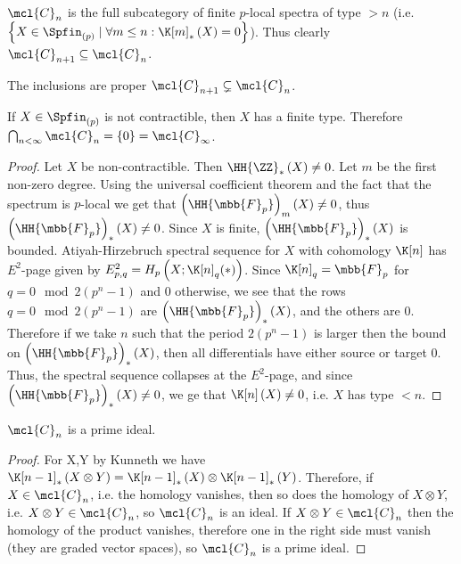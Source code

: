 \begin{corollary}
	$\mcl{C}_n$ is the full subcategory of finite $p$-local spectra of type $> n$ (i.e. $\left\{ X \in \Spfin_{\left(p\right)} \mid \forall m \leq n: \K[m]_*\left(X\right) = 0 \right\}$).
	Thus clearly $\mcl{C}_{n+1} \subseteq \mcl{C}_n$.
\end{corollary}

\begin{proposition}
	The inclusions are proper $\mcl{C}_{n+1} \subsetneq \mcl{C}_n$.
\end{proposition}

\begin{proposition}
	If $X \in \Spfin_{\left(p\right)}$ is not contractible, then $X$ has a finite type.
	Therefore $\bigcap_{n < \infty} \mcl{C}_n = \left\{0\right\} = \mcl{C}_\infty$.
\end{proposition}

\begin{proof}
	Let $X$ be non-contractible.
	Then $\HH{\ZZ}_*\left(X\right) \neq 0$.
	Let $m$ be the first non-zero degree.
	Using the universal coefficient theorem and the fact that the spectrum is $p$-local we get that $\left(\HH{\mbb{F}_p}\right)_m\left(X\right) \neq 0$, thus $\left(\HH{\mbb{F}_p}\right)_*\left(X\right) \neq 0$.
	Since $X$ is finite, $\left(\HH{\mbb{F}_p}\right)_*\left(X\right)$ is bounded.
	Atiyah-Hirzebruch spectral sequence for $X$ with cohomology $\K[n]$ has $E^2$-page given by
	$
	E_{p,q}^2
	= 
	H_p\left(X; \K[n]_q(*)\right)
	$.
	Since $\K[n]_q = \mbb{F}_p$ for $q = 0 \mod 2\left(p^n-1\right)$ and $0$ otherwise,
	we see that the rows $q = 0 \mod 2\left(p^n-1\right)$ are $\left(\HH{\mbb{F}_p}\right)_*\left(X\right)$, and the others are $0$.
	Therefore if we take $n$ such that the period $2\left(p^n-1\right)$ is larger then the bound on $\left(\HH{\mbb{F}_p}\right)_*\left(X\right)$, then all differentials have either source or target $0$.
	Thus, the spectral sequence collapses at the $E^2$-page, and since $\left(\HH{\mbb{F}_p}\right)_*\left(X\right) \neq 0$, we ge that $\K[n]\left(X\right) \neq 0$, i.e. $X$ has type $<n$.
\end{proof}

\begin{proposition}
	$\mcl{C}_n$ is a prime ideal.
\end{proposition}

\begin{proof}
	For X,Y by Kunneth we have $\K[n-1]_*\left(X \otimes  Y\right) = \K[n-1]_*\left(X\right) \otimes \K[n-1]_*\left(Y\right)$.
	Therefore, if $X \in \mcl{C}_n$, i.e. the homology vanishes, then so does the homology of $X \otimes Y$, i.e. $X \otimes Y \in \mcl{C}_n$, so $\mcl{C}_n$ is an ideal.
	If $X \otimes Y\in \mcl{C}_n$ then the homology of the product vanishes, therefore one in the right side must vanish (they are graded vector spaces), so $\mcl{C}_n$ is a prime ideal.
\end{proof}

